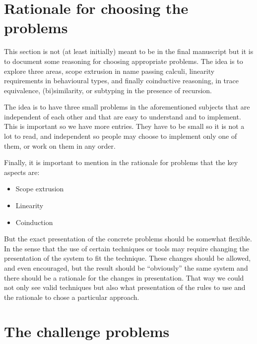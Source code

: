 \documentclass{jfp}
\begin{document}
\section{Rationale for choosing the problems}\label{sec:rationale}

This section is not (at least initially) meant to be in the final
manuscript but it is to document some reasoning for choosing
appropriate problems. The idea is to explore three areas, scope
extrusion in name passing calculi, linearity requirements in
behavioural types, and finally coinductive reasoning, in trace
equivalence, (bi)similarity, or subtyping in the presence of
recursion.

The idea is to have three small problems in the aforementioned
subjects that are independent of each other and that are easy to
understand and to implement. This is important so we have more
entries. They have to be small so it is not a lot to read, and
independent so people may choose to implement only one of them, or
work on them in any order.

Finally, it is important to mention in the rationale for problems that
the key aspects are:
\begin{itemize}
\item Scope extrusion
\item Linearity
\item Coinduction
\end{itemize}

But the exact presentation of the concrete problems should be somewhat
flexible. In the sense that the use of certain techniques or tools may
require changing the presentation of the system to fit the technique.
These changes should be allowed, and even encouraged, but the result
should be ``obviously'' the same system and there should be a
rationale for the changes in presentation. That way we could not only
see valid techniques but also what presentation of the rules to use
and the rationale to chose a particular approach.

\section{The challenge problems} \label{sec:problems}
\end{document}
